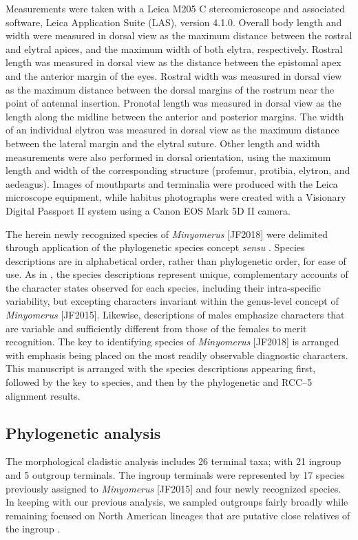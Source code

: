 \documentclass[fleqn,10pt,lineno]{wlpeerj} %
\begin{document}
		Measurements were taken with a Leica M205 C stereomicroscope and associated software, Leica Application Suite (LAS), version 4.1.0.
		Overall body length and width were measured in dorsal view as the maximum distance between the rostral and elytral apices, and the maximum width of both elytra, respectively.
		Rostral length was measured in dorsal view as the distance between the epistomal apex and the anterior margin of the eyes.
		Rostral width was measured in dorsal view as the maximum distance between the dorsal margins of the rostrum near the point of antennal insertion.
		Pronotal length was measured in dorsal view as the length along the midline between the anterior and posterior margins.
		The width of an individual elytron was measured in dorsal view as the maximum distance between the lateral margin and the elytral suture.
		Other length and width measurements were also performed in dorsal orientation, using the maximum length and width of the corresponding structure (profemur, protibia, elytron, and aedeagus).
		Images of mouthparts and terminalia were produced with the Leica microscope equipment, while habitus photographs were created with a Visionary Digital Passport II system using a Canon EOS Mark 5D II camera.

		The herein newly recognized species of \textit{Minyomerus} [JF2018] were delimited through application of the phylogenetic species concept \textit{sensu} \citet{wheeler2000}.
		Species descriptions are in alphabetical order, rather than phylogenetic order, for ease of use.
		As in \citet{jansen2015}, the species descriptions represent unique, complementary accounts of the character states observed for each species, including their intra-specific variability, but excepting characters invariant within the genus-level concept of \textit{Minyomerus} [JF2015].
		Likewise, descriptions of males emphasize characters that are variable and sufficiently different from those of the females to merit recognition.
		The key to identifying species of \textit{Minyomerus} [JF2018] is arranged with emphasis being placed on the most readily observable diagnostic characters.
		This manuscript is arranged with the species descriptions appearing first, followed by the key to species, and then by the phylogenetic and RCC--5 alignment results.
		
	\subsection*{Phylogenetic analysis}\label{ssec:phylo} 
		The morphological cladistic analysis includes 26 terminal taxa; with 21 ingroup and 5 outgroup terminals.
		The ingroup terminals were represented by 17 species previously assigned to \textit{Minyomerus} [JF2015] and four newly recognized species.
		In keeping with our previous analysis, we sampled outgroups fairly broadly while remaining focused on North American lineages that are putative close relatives of the ingroup \citep{jansen2015, nixon1993}.
		
\end{document}
